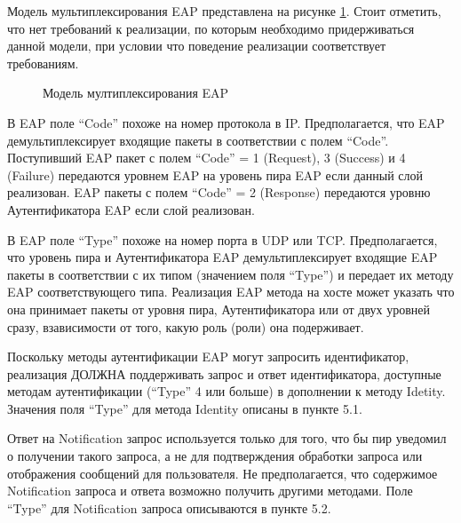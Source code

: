 Модель мультиплексирования EAP представлена на рисунке \ref{img:1}. Стоит отметить, что нет требований к реализации, по которым необходимо придерживаться данной модели, при условии что поведение реализации соответствует требованиям.

\begin{figure}[h]
\caption{Модель мултиплексирования EAP}
\label{img:1}
\end{figure}

В EAP поле ``Code'' похоже на номер протокола в IP. Предполагается, что EAP демультиплексирует входящие пакеты в соответствии с полем ``Code''. Поступивший EAP пакет с полем ``Code'' = 1 (Request), 3 (Success) и 4 (Failure) передаются уровнем EAP на уровень пира EAP если данный слой реализован. EAP пакеты с полем ``Code'' = 2 (Response) передаются уровню Аутентификатора EAP если слой реализован.

В EAP поле ``Type'' похоже на номер порта в UDP или TCP. Предполагается, что уровень пира и Аутентификатора EAP демультиплексирует входящие EAP пакеты в соответствии с их типом (значением поля ``Type'') и передает их методу EAP соответствующего типа. Реализация EAP метода на хосте может указать что она принимает пакеты от уровня пира, Аутентификатора или от двух уровней сразу, взависимости от того, какую роль (роли) она подерживает.

Поскольку методы аутентификации EAP могут запросить идентификатор, реализация ДОЛЖНА поддерживать запрос и ответ идентификатора, доступные методам аутентификации (``Type'' 4 или больше) в дополнении к методу Idetity. Значения поля ``Type'' для метода Identity описаны в пункте 5.1.

Ответ на Notification запрос используется только для того, что бы пир уведомил о получении такого запроса, а не для подтверждения обработки запроса или отображения сообщений для пользователя. Не предполагается, что содержимое Notification запроса и ответа возможно получить другими методами. Поле ``Type'' для Notification запроса описываются в пункте 5.2.

